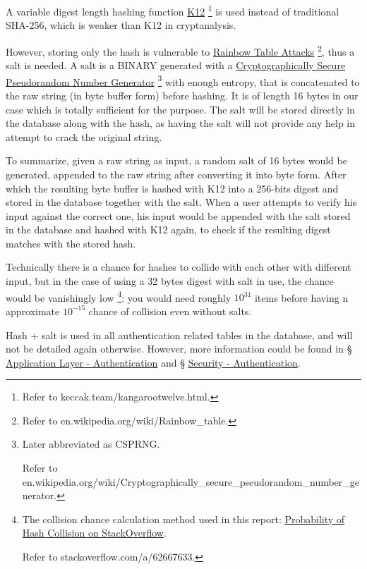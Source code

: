 \documentclass[12pt]{report}
\newcommand{\n}{\par}
\begin{document}
\begin{itemize}
	      A variable digest length hashing function
	      \href{https://keccak.team/kangarootwelve.html}{K12}
	      \footnote{Refer to keccak.team/kangarootwelve.html.}
	      is used instead of traditional SHA-256, which is weaker than K12 in cryptanalysis.\n
	      However, storing only the hash is vulnerable to
	      \href{https://en.wikipedia.org/wiki/Rainbow_table}{Rainbow Table Attacks}
	      \footnote{Refer to en.wikipedia.org\-/wiki/Rainbow\_table.},
	      thus a salt is needed. A salt is a BINARY generated with a
	      \href{https://en.wikipedia.org/wiki/Cryptographically_secure_pseudorandom_number_generator}{Cryptographically Secure Pseudorandom Number Generator}
	      \footnote{Later abbreviated as CSPRNG.\n
		      Refer to en.wikipedia.org/wiki/Cryptographically\_secure\_pseudorandom\_number\_generator.}
	      with enough entropy, that is concatenated to the raw string (in byte buffer form) before hashing.
	      It is of length 16 bytes in our case which is totally sufficient for the purpose.
	      The salt will be stored directly in the database along with the hash,
	      as having the salt will not provide any help in attempt to crack the original string.\n
	      To summarize, given a raw string as input, a random salt of 16 bytes would be generated,
	      appended to the raw string after converting it into byte form.
	      After which the resulting byte buffer is hashed with K12 into a 256-bits digest and stored in the database together with the salt.
	      When a user attempts to verify his input against the correct one,
	      his input would be appended with the salt stored in the database and hashed with K12 again,
	      to check if the resulting digest matches with the stored hash.\n
	      Technically there is a chance for hashes to collide with each other with different input,
	      but in the case of using a 32 bytes digest with salt in use, the chance would be vanishingly low
	      \footnote{The collision chance calculation method used in this report: \href{https://stackoverflow.com/a/62667633}{Probability of Hash Collision on StackOverflow}.\n
		      Refer to stackoverflow.com/a/62667633.}:
	      you would need roughly $10^{31}$ items before having n approximate $10^{-15}$ chance of collision even without salts.\n
	      Hash + salt is used in all authentication related tables in the database, and will not be detailed again otherwise.
	      However, more information could be found in
	      \S{} \hyperref[application-layer.implementation.authentication]{Application Layer - Authentication} and
	      \S{} \hyperref[security.authentication]{Security - Authentication}.
\end{itemize}
\end{document}

